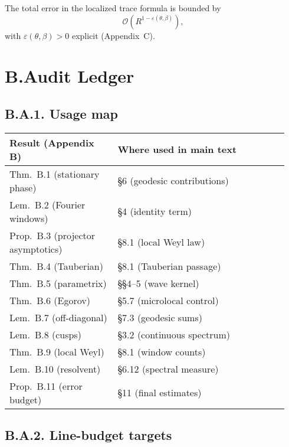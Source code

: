 \begin{proposition}\label{prop:B11}
The total error in the localized trace formula is bounded by
\[
\mathcal{O}\!\left(R^{1-\varepsilon(\theta,\beta)}\right),
\]
with $\varepsilon(\theta,\beta)>0$ explicit (Appendix~C).
\end{proposition}

\section*{B.Audit Ledger}\label{sec:B-audit}

\subsection*{B.A.1. Usage map}

\begin{tabular}{p{0.36\linewidth}p{0.58\linewidth}}
\toprule
\textbf{Result (Appendix B)} & \textbf{Where used in main text} \\
\midrule
Thm.~B.1 (stationary phase) & §6 (geodesic contributions) \\
Lem.~B.2 (Fourier windows) & §4 (identity term) \\
Prop.~B.3 (projector asymptotics) & §8.1 (local Weyl law) \\
Thm.~B.4 (Tauberian) & §8.1 (Tauberian passage) \\
Thm.~B.5 (parametrix) & §§4–5 (wave kernel) \\
Thm.~B.6 (Egorov) & §5.7 (microlocal control) \\
Lem.~B.7 (off-diagonal) & §7.3 (geodesic sums) \\
Lem.~B.8 (cusps) & §3.2 (continuous spectrum) \\
Thm.~B.9 (local Weyl) & §8.1 (window counts) \\
Lem.~B.10 (resolvent) & §6.12 (spectral measure) \\
Prop.~B.11 (error budget) & §11 (final estimates) \\
\bottomrule
\end{tabular}

\subsection*{B.A.2. Line-budget targets}

